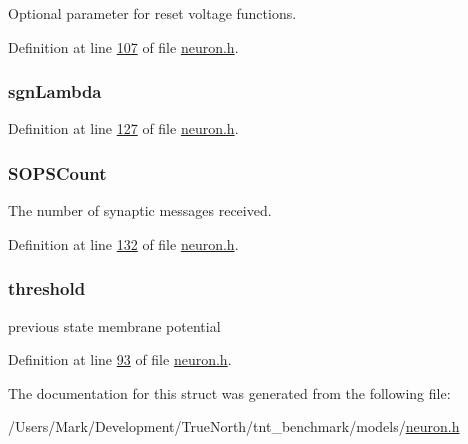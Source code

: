 Optional parameter for reset voltage functions. 



Definition at line \hyperlink{neuron_8h_source_l00107}{107} of file \hyperlink{neuron_8h_source}{neuron.\+h}.

\hypertarget{structneuron_state_a46a71f61511b5311e14643084109d90f}{}
\subsubsection[{sgn\+Lambda}]{ sgn\+Lambda}\label{structneuron_state_a46a71f61511b5311e14643084109d90f}


Definition at line \hyperlink{neuron_8h_source_l00127}{127} of file \hyperlink{neuron_8h_source}{neuron.\+h}.

\hypertarget{structneuron_state_a71fbb9a79e8048b473b6e09d29a64bbe}{}
\subsubsection[{S\+O\+P\+S\+Count}]{ S\+O\+P\+S\+Count}\label{structneuron_state_a71fbb9a79e8048b473b6e09d29a64bbe}


The number of synaptic messages received. 



Definition at line \hyperlink{neuron_8h_source_l00132}{132} of file \hyperlink{neuron_8h_source}{neuron.\+h}.

\hypertarget{structneuron_state_af321d0fa58028b78986160845189077e}{}
\subsubsection[{threshold}]{ threshold}\label{structneuron_state_af321d0fa58028b78986160845189077e}


previous state membrane potential 



Definition at line \hyperlink{neuron_8h_source_l00093}{93} of file \hyperlink{neuron_8h_source}{neuron.\+h}.



The documentation for this struct was generated from the following file\+:\begin{DoxyCompactItemize}
\item 
/\+Users/\+Mark/\+Development/\+True\+North/tnt\+\_\+benchmark/models/\hyperlink{neuron_8h}{neuron.\+h}\end{DoxyCompactItemize}
